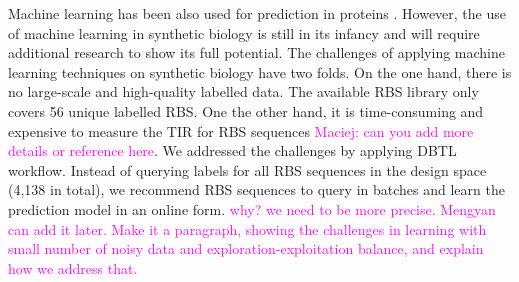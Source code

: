 \documentclass{article}
\newcommand{\mengyan}[1]{\textcolor{magenta}{#1}}
\begin{document}
Machine learning has been also used for prediction in proteins \cite{Yang2018}.
However, the use of machine learning in synthetic biology is still in its infancy and will require additional research to show its full potential. 
The challenges of applying machine learning techniques on synthetic biology have two folds.
On the one hand, there is no large-scale and high-quality labelled data. The available RBS library \cite{jervis2018machine} only covers 56 unique labelled RBS.
One the other hand, it is time-consuming and expensive to measure the TIR for RBS sequences \mengyan{Maciej: can you add more details or reference here}. 
We addressed the challenges by applying DBTL workflow. 
Instead of querying labels for all RBS sequences in the design space (4,138 in total), we recommend RBS sequences to query in batches and learn the prediction model in an online form.
\mengyan{why? we need to be more precise. Mengyan can add it later. Make it a paragraph, showing the challenges in learning with small number of noisy data and exploration-exploitation balance, and explain how we address that.} 
\end{document}
